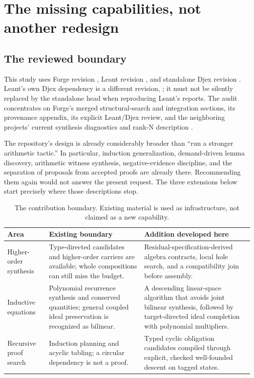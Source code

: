 \section{The missing capabilities, not another redesign}
\label{sec:scope}

\subsection{The reviewed boundary}

This study uses Forge revision , Leant revision
, and standalone Djex revision .
Leant's own Djex dependency is a different revision, ; it must not
be silently replaced by the standalone head when reproducing Leant's reports.
The audit concentrates on Forge's merged structural-search and integration
sections, its provenance appendix, its explicit Leant/Djex review, and the
neighboring projects' current synthesis diagnostics and rank-N description
\cite{forge,forge-structural,forge-integration,forge-provenance,forge-neighbors,leant,djex-rank}.

The repository's design is already considerably broader than ``run a stronger
arithmetic tactic.'' In particular, induction generalization, demand-driven
lemma discovery, arithmetic witness synthesis, negative-evidence discipline,
and the separation of proposals from accepted proofs are already there.
Recommending them again would not answer the present request. The three
extensions below start precisely where those descriptions stop.

\begin{table}[ht]
\small
\begin{tabularx}{\textwidth}{@{}p{}YY@{}}
\toprule
Area & Existing boundary & Addition developed here \\
\midrule
Higher-order synthesis & Type-directed candidates and higher-order carriers are available; whole compositions can still miss the budget. & Residual-specification-derived algebra contracts, local hole search, and a compatibility join before assembly. \\
Inductive equations & Polynomial recurrence synthesis and conserved quantities; general coupled ideal preservation is recognized as bilinear. & A descending linear-space algorithm that avoids joint bilinear synthesis, followed by target-directed ideal completion with polynomial multipliers. \\
Recursive proof search & Induction planning and acyclic tabling; a circular dependency is not a proof. & Typed cyclic obligation candidates compiled through explicit, checked well-founded descent on tagged states. \\
\bottomrule
\end{tabularx}
\caption{The contribution boundary. Existing material is used as infrastructure, not claimed as a new capability.}
\end{table}

